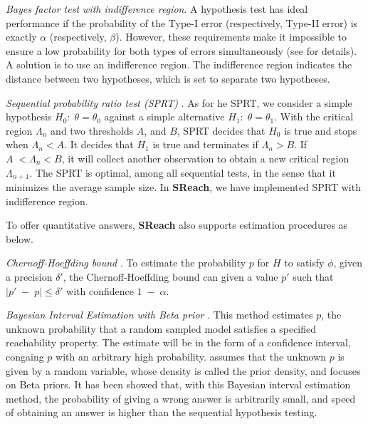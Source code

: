 \textit{Bayes factor test with indifference region}. 
A hypothesis test has ideal performance if the probability of the Type-I error (respectively, Type-II error) is exactly $\alpha$ (respectively, $\beta$). However, these requirements make it impossible to ensure a low probability for both types of errors simultaneously (see \cite{younes2005verification} for details). A solution is to use an indifference region. The indifference region indicates the distance between two hypotheses, which is set to separate two hypotheses.

\textit{Sequential probability ratio test (SPRT)} \cite{wald1945sequential}. 
As for he SPRT, we consider a simple hypothesis $H_0:\;\theta = \theta_0$ against a simple alternative $H_1:\;\theta = \theta_1$. With the critical region $\Lambda_n$ and two thresholds $A$, and $B$, SPRT decides that $H_0$ is true and stops when $\Lambda_n < A$. It decides that $H_1$ is true and terminates if $\Lambda_n > B$. If $A\; < \Lambda_n < B$, it will collect another observation to obtain a new critical region $\Lambda_{n+1}$. The SPRT is optimal, among all sequential tests, in the sense that it minimizes the average sample size. In {\bf SReach}, we have implemented SPRT with indifference region.

To offer quantitative answers, {\bf SReach} also supports estimation procedures as below.

\textit{Chernoff-Hoeffding bound} \cite{hoeffding1963probability}. To estimate the probability $p$ for $H$ to satisfy $\phi$, given a precision $\delta'$, the Chernoff-Hoeffding bound can given a value $p'$ such that $|p' \; - \; p| \le \delta'$ with confidence $1\;-\; \alpha$.

\textit{Bayesian Interval Estimation with Beta prior} \cite{zuliani2010bayesian}. This method estimates $p$, the unknown probability that a random sampled model satisfies a specified reachability property. The estimate will be in the form of a confidence interval, congaing $p$ with an arbitrary high probability.  \cite{zuliani2010bayesian} assumes that the unknown $p$ is given by a random variable, whose density is called the prior density, and focuses on Beta priors. It has been showed that, with this Bayesian interval estimation method, the probability of giving a wrong answer is arbitrarily small, and speed of obtaining an answer is higher than the sequential hypothesis testing.